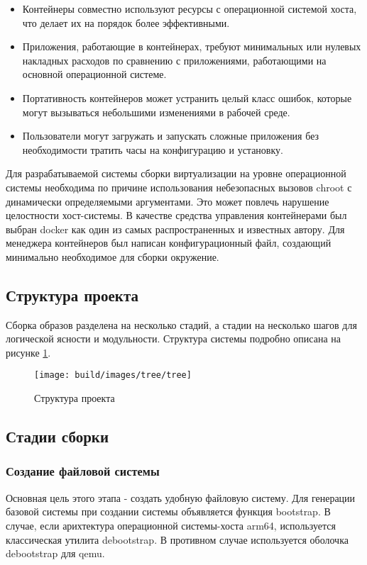 \begin{itemize}
  \item Контейнеры совместно используют ресурсы с операционной системой хоста, что делает их на порядок более эффективными.
  \item Приложения, работающие в контейнерах, требуют минимальных или нулевых накладных расходов по сравнению с приложениями, работающими на основной операционной системе.
  \item Портативность контейнеров может устранить целый класс ошибок, которые могут вызываться небольшими изменениями в рабочей среде.
  \item Пользователи могут загружать и запускать сложные приложения без необходимости тратить часы на конфигурацию и установку.
\end{itemize}
Для разрабатываемой системы сборки виртуализации на уровне операционной системы необходима по причине использования небезопасных вызовов chroot с динамически определяемыми аргументами.
Это может повлечь нарушение целостности хост-системы.
В качестве средства управления контейнерами был выбран docker как один из самых распространенных и известных автору.
Для менеджера контейнеров был написан конфигурационный файл, создающий минимально необходимое для сборки окружение.

\newpage
\subsection{Структура проекта}
Сборка образов разделена на несколько стадий, а стадии на несколько шагов для логической ясности и модульности.
Структура системы подробно описана на рисунке \ref{fig:project-tree}.
\begin{figure}[h!]
  \centering
  \setlength{\fboxsep}{5pt}
  \texttt{[image: build/images/tree/tree]}
  \vspace*{6pt}
  \caption{Структура проекта}\label{fig:project-tree}
\end{figure}


\newpage
\subsection{Стадии сборки}
\subsubsection{Создание файловой системы}
Основная цель этого этапа - создать удобную файловую систему.
Для генерации базовой системы при создании системы объявляется функция bootstrap.
В случае, если арихтектура операционной системы-хоста arm64, используется классическая утилита debootstrap. В противном случае используется оболочка debootstrap для qemu.


